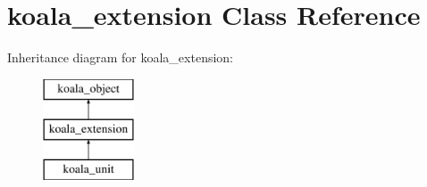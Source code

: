 \hypertarget{classkoala__extension}{
\section{koala\_\-extension Class Reference}
\label{classkoala__extension}
}
Inheritance diagram for koala\_\-extension:\begin{figure}[H]
\begin{center}
\leavevmode
\includegraphics[height=3.000000cm]{classkoala__extension}
\end{center}
\end{figure}
